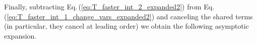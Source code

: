 \documentclass[sn-mathphys,Numbered]{sn-jnl}
\newcommand{\req}[1]{Eq.\,(\ref{#1})}
\begin{document}

Finally, subtracting \req{eq:T_faster_int_2_expanded2} from \req{eq:T_faster_int_1_change_vars_expanded2} and canceling the shared terms (in particular, they cancel at leading order) we obtain the following asymptotic expansion.
\end{document}
